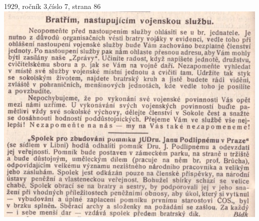 \documentclass[11pt]{article}
\begin{document}
1929, ročník 3,číslo 7, strana 86 \\
\includegraphics[width=\imagewidth]{original/1929/Skener_20250318 (15).jpg}



\end{document}
